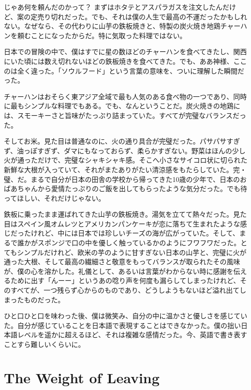 \documentclass[
  letterpaper,
  oneside]{scrbook}
\begin{document}
じゃあ何を頼んだのかって？
まずはホタテとアスパラガスを注文したんだけど、案の定売り切れだった。でも、それは僕の人生で最高の不運だったかもしれない。なぜなら、その代わりに山芋の鉄板焼きと、特製の炭火焼き地鶏チャーハンを頼むことになったからだ。特に気取った料理ではない。

日本での冒険の中で、僕はすでに星の数ほどのチャーハンを食べてきたし、関西にいた頃には数え切れないほどの鉄板焼きを食べてきた。でも、ああ神様、ここのは全く違った。「ソウルフード」という言葉の意味を、ついに理解した瞬間だった。

チャーハンはおそらく東アジア全域で最も人気のある食べ物の一つであり、同時に最もシンプルな料理でもある。でも、なんということだ。炭火焼きの地鶏には、スモーキーさと旨味がたっぷり詰まっていた。すべてが完璧なバランスだった。

そしてお米。見た目は普通なのに、火の通り具合が完璧だった。パサパサすぎず、油っぽすぎず、ダマにもなっておらず、柔らかすぎない。野菜はほんの少し火が通っただけで、完璧なシャキシャキ感。そこへ小さなサイコロ状に切られた新鮮な大根が入っていて、それがまたありがたい清涼感をもたらしていた。完・璧、だ。まるで自分が日本の田舎の学校から帰ってきた10歳の少年で、日本のおばあちゃんから愛情たっぷりのご飯を出してもらったような気分だった。でも待ってほしい、それだけじゃない。

鉄板に乗ったまま運ばれてきた山芋の鉄板焼き。湯気を立てて熱々だった。見た目はスペイン風オムレツとアメリカンパンケーキが恋に落ちて生まれたような感じだったけれど、中には日本では珍しいチーズの海が広がっていた。そして、まるで誰かがスポンジで口の中を優しく触っているかのようにフワフワだった。とてもシンプルだけれど、欧米の芋のように甘すぎない日本の山芋と、完璧に火が通った大根、そして最高の繊細さと敬意をもってバランスが取られたその風味が、僕の心を溶かした。礼儀として、あるいは言葉がわからない時に感謝を伝えるために出す「んーー」というあの唸り声を何度も漏らしてしまったけれど、そのすべてが、一つ残らず心からのものであり、どうしようもないほど溢れ出てしまったものだった。

ひと口ひと口を味わった後、僕は微笑み、自分の中に温かさと優しさを感じていた。自分が感じていることを日本語で表現することはできなかった。僕の拙い日本語レベルを遥かに超えるほど、それは複雑な感情だった。今、英語で書き表すことすら難しいくらいに。


\chapter{The Weight of Leaving}\label{the-weight-of-leaving}
\end{document}
